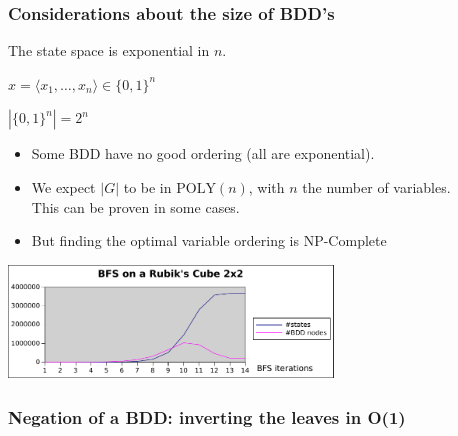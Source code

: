\documentclass[10pt,a4paper,pdf]{beamer}
\renewcommand{\t}[1]{\text{#1}}
\begin{document}
\begin{frame}
\frametitle{Considerations about the size of BDD's}

The state space is exponential in $n$.

$x = \langle x_1, \ldots, x_n \rangle \in \{0,1\}^n$

$|\{0,1\}^n| = 2^n$

\begin{itemize}
\item Some BDD have no good ordering (all are exponential).
\item We expect $|G|$ to be in $\t{POLY}(n)$, with $n$ the number of variables.\\
This can be proven in some cases.
\pause
\item But finding the optimal variable ordering is NP-Complete
\end{itemize}
\pause
\begin{center}
\includegraphics[height=3cm]{images/exponential.pdf}
\end{center}

\begin{center}

\end{center}

\end{frame}

\begin{frame}
\frametitle{Negation of a BDD: inverting the leaves in O(1)}
\begin{center}


\end{center}

\end{frame}
\end{document}
